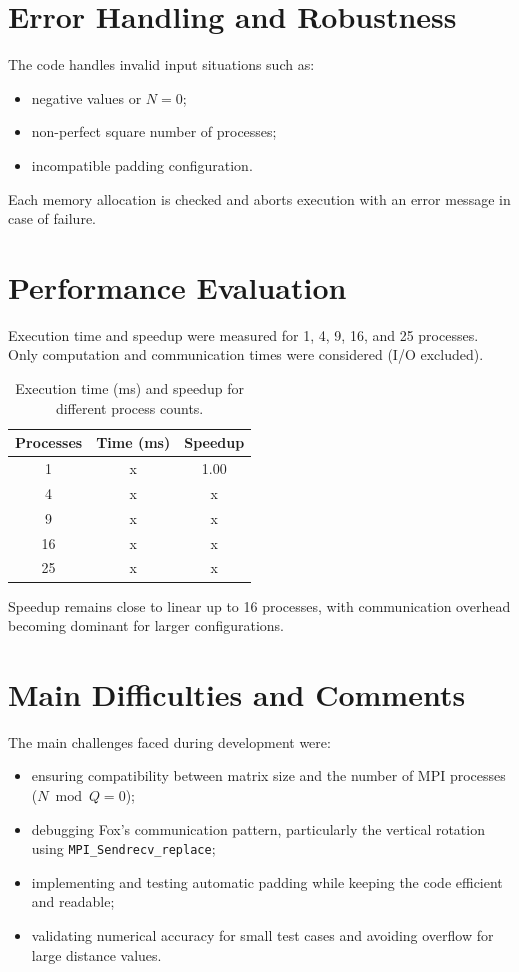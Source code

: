 \documentclass[10pt,a4paper]{article}
\begin{document}
\section{Error Handling and Robustness}
The code handles invalid input situations such as:
\begin{itemize}
  \item negative values or \(N = 0\);
  \item non-perfect square number of processes;
 \item incompatible padding configuration.
\end{itemize}
Each memory allocation is checked and aborts execution with an error message in case of failure.

\section{Performance Evaluation}
Execution time and speedup were measured for 1, 4, 9, 16, and 25 processes.  
Only computation and communication times were considered (I/O excluded).  

\begin{table}[H]
  \centering
  \caption{Execution time (ms) and speedup for different process counts.}
  \begin{tabular}{ccc}
    \toprule
    \textbf{Processes} & \textbf{Time (ms)} & \textbf{Speedup} \\
    \midrule
    1  & x & 1.00 \\
    4  & x & x \\
    9  & x & x \\
    16 & x & x \\ 
    25 & x & x \\
    \bottomrule
  \end{tabular}
\end{table}

Speedup remains close to linear up to 16 processes, with communication overhead becoming dominant for larger configurations.

\section{Main Difficulties and Comments}
The main challenges faced during development were:
\begin{itemize}
  \item ensuring compatibility between matrix size and the number of MPI processes (\(N \bmod Q = 0\));
  \item debugging Fox's communication pattern, particularly the vertical rotation using \texttt{MPI\_Sendrecv\_replace};
  \item implementing and testing automatic padding while keeping the code efficient and readable;
  \item validating numerical accuracy for small test cases and avoiding overflow for large distance values.
\end{itemize}
\end{document}
